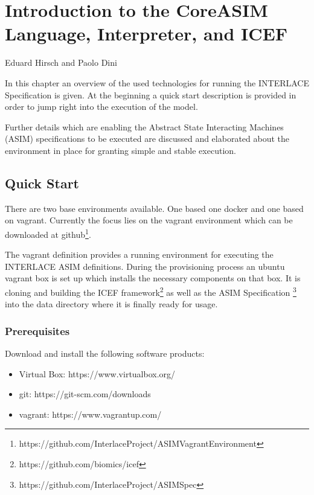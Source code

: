 \chapter{Introduction to the CoreASIM Language, Interpreter, and ICEF}
\label{ch:CoreAsimIntro}

\vspace{-1cm}
\begin{center}
Eduard Hirsch and Paolo Dini
\end{center}

In this chapter an overview of the used technologies for running the INTERLACE
Specification is given. At the beginning a quick start description is provided in
order to jump right into the execution of the model.

Further details which are enabling the Abstract State Interacting Machines (ASIM)
specifications to be executed are discussed and elaborated about the environment in place for granting simple and stable execution.

\section{Quick Start}

There are two base environments available. One based one docker and one
based on vagrant. Currently the focus lies on the vagrant environment which can be
downloaded at github\footnote{https://github.com/InterlaceProject/ASIMVagrantEnvironment}.

The vagrant definition provides a running environment for executing the INTERLACE ASIM definitions. During the provisioning process an ubuntu vagrant box is set up which installs the necessary components on that box. It is cloning and building the ICEF framework\footnote{https://github.com/biomics/icef} as well as the ASIM Specification
\footnote{https://github.com/InterlaceProject/ASIMSpec} into the data directory
where it is finally ready for usage.

\subsection{Prerequisites}

Download and install the following software products:

\begin{itemize}
	\item Virtual Box: https://www.virtualbox.org/
	\item git: https://git-scm.com/downloads
	\item vagrant: https://www.vagrantup.com/
\end{itemize}

